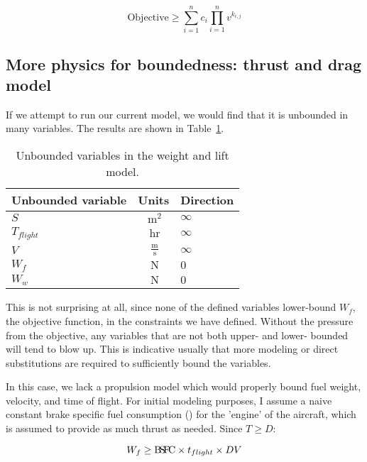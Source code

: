 \begin{equation}
    \mathrm{Objective} \geq \sum\limits^n_{i=1}c_{i}\prod\limits^n_{i=1}  v^{k_{i,j}}
    \label{e:posyobj}
\end{equation}

\subsection{More physics for boundedness: thrust and drag model}
\label{s:td}

If we attempt to run our current model, we would find that it is unbounded in many variables.
The results are shown in Table~\ref{t:WandL_unbounded}.

\begin{footnotesize}
\begin{table}
    \centering
    \begin{tabular}{ l c l }
        \toprule
        Unbounded variable & Units & Direction \\
        \midrule
        $S$ & $~\mathrm{m^{2}}$ & $\infty$ \\
        $T_{flight}$ & $~\mathrm{hr}$ & $\infty$ \\
        $V$ &  $~\mathrm{\tfrac{m}{s}}$  & $\infty$ \\
        $W_f$ & $~\mathrm{N}$ & $0$ \\
        $W_w$ & $~\mathrm{N}$  & $0$ \\
        \bottomrule
    \end{tabular}
    \caption{Unbounded variables in the weight and lift model.}
    \label{t:WandL_unbounded}
\end{table} \end{footnotesize}

This is not surprising at all, since none of the defined variables lower-bound $W_f$,
the objective function, in the constraints we have defined.
Without the pressure from the objective, any variables that
are not both upper- and lower- bounded will tend to blow up. This is indicative usually
that more modeling or direct substitutions are required to sufficiently bound the variables.

In this case, we lack a propulsion model which would properly bound fuel weight, velocity,
and time of flight. For initial modeling purposes, I assume a naive constant brake
specific fuel consumption (\BSFC) for the 'engine' of the aircraft, which is assumed
to provide as much thrust as needed. Since $T \geq D$:

\begin{equation}
    W_f \geq {\rm B\!S\!F\!C} \times t_{flight} \times DV
    \label{e:W_f}
\end{equation}

